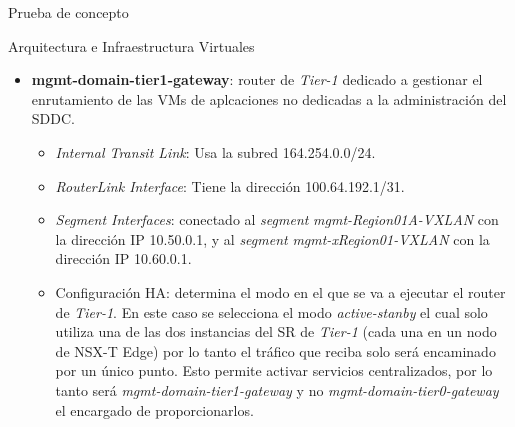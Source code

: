 \begin{section}{Prueba de concepto}
\begin{subsection}{Arquitectura e Infraestructura Virtuales\cite{CFVirtInfraes}}
\begin{itemize}
  \item \textbf{mgmt-domain-tier1-gateway}: router de \textit{Tier-1} dedicado a gestionar el enrutamiento de las VMs de aplcaciones no dedicadas a la administración del SDDC. 
  \begin{itemize}
    \item \textit{Internal Transit Link}: Usa la subred 164.254.0.0/24.
    \item \textit{RouterLink Interface}: Tiene la dirección 100.64.192.1/31.
    \item \textit{Segment Interfaces}: conectado al \textit{segment} \textit{mgmt-Region01A-VXLAN} con la dirección IP 10.50.0.1, y al \textit{segment} \textit{mgmt-xRegion01-VXLAN} con la dirección IP 10.60.0.1.
    \item Configuración HA: determina el modo en el que se va a ejecutar el router de \textit{Tier-1}. En este caso se selecciona el modo \textit{active-stanby} el cual solo utiliza una de las dos instancias del SR de \textit{Tier-1} (cada una en un nodo de NSX-T Edge) por lo tanto el tráfico que reciba solo será encaminado por un único punto. Esto permite activar servicios centralizados, por lo tanto será \textit{mgmt-domain-tier1-gateway} y no \textit{mgmt-domain-tier0-gateway} el encargado de proporcionarlos.
  \end{itemize}
\end{itemize}

  
  


\end{subsection}
\end{section}
